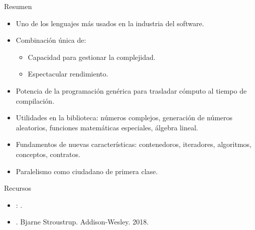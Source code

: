 \begin{frame}[t]{Resumen}
\begin{itemize}
  \item Uno de los lenguajes más usados en la industria del software.
  \vfill\pause
  \item Combinación única de:
    \begin{itemize}
      \item Capacidad para gestionar la complejidad.
      \item Espectacular rendimiento.
    \end{itemize}
  \vfill\pause
  \item Potencia de la programación genérica para trasladar cómputo 
        al tiempo de compilación.
  \vfill\pause
  \item Utilidades en la biblioteca: números complejos, generación de
        números aleatorios, funciones matemáticas especiales, álgebra lineal.
  \vfill\pause
  \item Fundamentos de nuevas características: contenedoros, iteradores, algoritmos,
        conceptos, contratos.
  \vfill\pause
  \item Paralelismo como ciudadano de primera clase. 
\end{itemize}
\end{frame}

\begin{frame}[t]{Recursos}
\begin{itemize}
  \item {}: .
  \vfill
  \item {}.
        Bjarne Stroustrup.
        Addison-Wesley.
        2018.
      
\end{itemize}
\end{frame}
